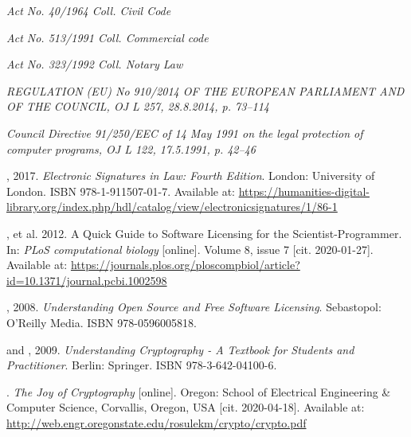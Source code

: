 \documentclass[thesismargins, english, thesislinespacing, onelinechapterstyle, upjsfrontpage]{rnthesis}
\begin{document}
\begin{thebibliography}{9}

  \emph{Act No. 40/1964 Coll. Civil Code}

  \emph{Act No. 513/1991 Coll. Commercial code}

  \emph{Act No. 323/1992 Coll. Notary Law}

  \emph{REGULATION (EU) No 910/2014 OF THE EUROPEAN PARLIAMENT AND OF THE COUNCIL, OJ L 257, 28.8.2014, p. 73–114}

  \emph{Council Directive 91/250/EEC of 14 May 1991 on the legal protection of computer programs, OJ L 122, 17.5.1991, p. 42–46}

  , 2017. \emph{Electronic Signatures in Law: Fourth Edition}. London: University of London. ISBN 978-1-911507-01-7. Available at: \url{https://humanities-digital-library.org/index.php/hdl/catalog/view/electronicsignatures/1/86-1}

  , et al. 2012. A Quick Guide to Software Licensing for the Scientist-Programmer. In: \emph{PLoS computational biology} [online]. Volume 8, issue 7 [cit. 2020-01-27]. Available at: \url{https://journals.plos.org/ploscompbiol/article?id=10.1371/journal.pcbi.1002598}

  , 2008. \emph{Understanding Open Source and Free Software Licensing}. Sebastopol: O’Reilly Media. ISBN 978-0596005818.

   and , 2009. \emph{Understanding Cryptography - A Textbook for Students and Practitioner}. Berlin: Springer. ISBN 978-3-642-04100-6.

  . \emph{The Joy of Cryptography} [online]. Oregon: School of Electrical Engineering \& Computer Science, Corvallis, Oregon, USA [cit. 2020-04-18]. Available at: \url{http://web.engr.oregonstate.edu/rosulekm/crypto/crypto.pdf}


\end{thebibliography}
\end{document}
